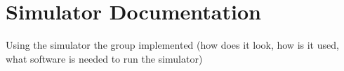 \chapter{Simulator Documentation}\label{simulatorDoc}
Using the simulator the group implemented (how does it look, how is it used, what software is needed to run the simulator)
